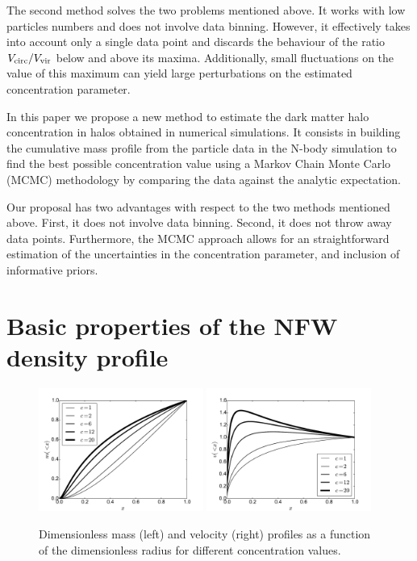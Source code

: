 \documentclass{emulateapj}
\begin{document}
The second method solves the two problems mentioned above.
It works with low particles numbers and does not involve data
binning.
However, it effectively takes into account only a single data point
and discards the behaviour of the ratio $V_{\rm circ}/V_{\rm vir}$ below and
above its maxima.
Additionally, small fluctuations on the value of this maximum can
yield large perturbations on the estimated concentration parameter.

In this paper we propose a new method to estimate the dark matter halo
concentration in halos obtained in numerical simulations.
It consists in building the cumulative mass profile from the
particle data in the N-body simulation to find the best possible
concentration value using a Markov Chain Monte Carlo (MCMC)
methodology by comparing the data against the analytic expectation.

Our proposal has two advantages with respect to the two methods mentioned
above.
First, it does not involve data binning.
Second, it does not throw away data points.
Furthermore, the MCMC approach allows for an straightforward
estimation of the uncertainties in the concentration parameter, and
inclusion of informative priors.


\section{Basic properties of the NFW density profile}
\label{sec:basics}

\begin{figure}
\begin{center}
  \includegraphics[width=0.48\textwidth]{nfw_normalized.pdf}
  \includegraphics[width=0.48\textwidth]{vel_normalized.pdf}
\end{center}
\caption{Dimensionless mass (left) and velocity (right) profiles as a
  function of the dimensionless radius for different concentration
  values. \label{fig:profiles}}
\end{figure}
\end{document}
